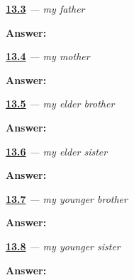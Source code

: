 \noindent\begin{minipage}[t]{\linewidth}
\raggedright
\hyperlink{review-JA-C13-chichi-recall}{\textbf{13.3}} \emph{ — my father}\par
\small \textbf{Answer:} \par
\end{minipage}\par\medskip

\noindent\begin{minipage}[t]{\linewidth}
\raggedright
\hyperlink{review-JA-C13-haha-recall}{\textbf{13.4}} \emph{ — my mother}\par
\small \textbf{Answer:} \par
\end{minipage}\par\medskip

\noindent\begin{minipage}[t]{\linewidth}
\raggedright
\hyperlink{review-JA-C13-ani-recall}{\textbf{13.5}} \emph{ — my elder brother}\par
\small \textbf{Answer:} \par
\end{minipage}\par\medskip

\noindent\begin{minipage}[t]{\linewidth}
\raggedright
\hyperlink{review-JA-C13-ane-recall}{\textbf{13.6}} \emph{ — my elder sister}\par
\small \textbf{Answer:} \par
\end{minipage}\par\medskip

\noindent\begin{minipage}[t]{\linewidth}
\raggedright
\hyperlink{review-JA-C13-otouto-recall}{\textbf{13.7}} \emph{ — my younger brother}\par
\small \textbf{Answer:} \par
\end{minipage}\par\medskip

\noindent\begin{minipage}[t]{\linewidth}
\raggedright
\hyperlink{review-JA-C13-imouto-recall}{\textbf{13.8}} \emph{ — my younger sister}\par
\small \textbf{Answer:} \par
\end{minipage}\par\medskip

